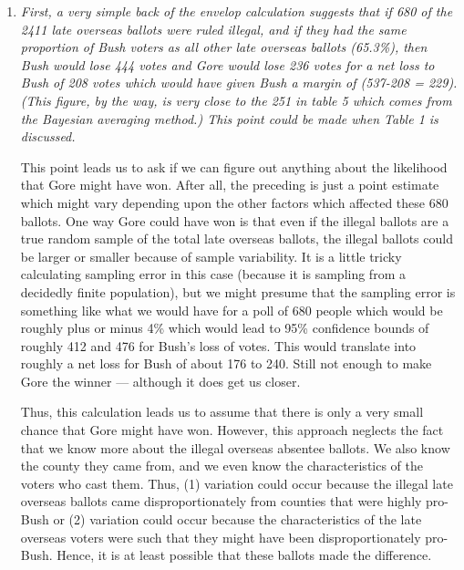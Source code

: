 \documentclass[11pt]{article}
\begin{document}
\begin{enumerate}
\item {\it First, a very simple back of the envelop calculation
    suggests that if 680 of the 2411 late overseas ballots were ruled
    illegal, and if they had the same proportion of Bush voters as all
    other late overseas ballots (65.3\%), then Bush would lose 444
    votes and Gore would lose 236 votes for a net loss to Bush of 208
    votes which would have given Bush a margin of (537-208 = 229).
    (This figure, by the way, is very close to the 251 in table 5
    which comes from the Bayesian averaging method.)  This point could
    be made when Table 1 is discussed. 
    
    This point leads us to ask if we can figure out anything about the
    likelihood that Gore might have won.  After all, the preceding is
    just a point estimate which might vary depending upon the other
    factors which affected these 680 ballots.  One way Gore could have
    won is that even if the illegal ballots are a true random sample
    of the total late overseas ballots, the illegal ballots could be
    larger or smaller because of sample variability.  It is a little
    tricky calculating sampling error in this case (because it is
    sampling from a decidedly finite population), but we might presume
    that the sampling error is something like what we would have for a
    poll of 680 people which would be roughly plus or minus 4\% which
    would lead to 95\% confidence bounds of roughly 412 and 476 for
    Bush's loss of votes.  This would translate into roughly a net
    loss for Bush of about 176 to 240.  Still not enough to make Gore
    the winner --- although it does get us closer. 
    
    Thus, this calculation leads us to assume that there is only a
    very small chance that Gore might have won.  However, this
    approach neglects the fact that we know more about the illegal
    overseas absentee ballots.  We also know the county they came
    from, and we even know the characteristics of the voters who cast
    them.  Thus, (1) variation could occur because the illegal late
    overseas ballots came disproportionately from counties that were
    highly pro-Bush or (2) variation could occur because the
    characteristics of the late overseas voters were such that they
    might have been disproportionately pro-Bush.  Hence, it is at
    least possible that these ballots made the difference.}
  

\end{enumerate}
\end{document}
